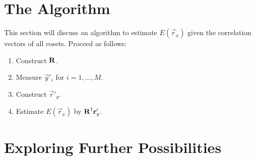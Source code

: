 \documentclass[a4paper, openany, oneside]{memoir}
\begin{document}
\section{The Algorithm}
This section will discuss an algorithm to estimate $E(\vec{r}_x)$ given the correlation vectors of all cosets. Proceed as follows:
\begin{enumerate}
    \item Construct $\boldsymbol{\mathbf{R}}$.
    \item Measure $\vec{y}'_i$ for $i = 1,\ldots,M$.
    \item Construct $\vec{r}'_y$.
    \item Estimate $E(\vec{r}_x)$ by $\boldsymbol{\mathbf{R}}^\dagger\boldsymbol{\mathbf{r}}'_y$.
\end{enumerate}

\section{Exploring Further Possibilities}
\end{document}
